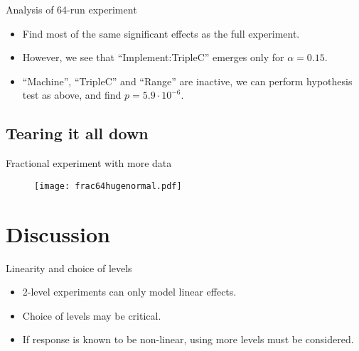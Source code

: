 \documentclass[english,handout,aspectratio=169]{ifislide}
\begin{document}
\begin{frame}{Analysis of 64-run experiment}

  \begin{itemize}
  \item Find most of the same significant effects as the full experiment.
  \item However, we see that ``Implement:TripleC'' emerges only for
  $\alpha=0.15$.
  \item ``Machine'', ``TripleC'' and ``Range'' are inactive, we can
    perform hypothesis test as above, and find $p = 5.9 \cdot 10^{-6}$.
  \end{itemize}
\end{frame}

\subsection{Tearing it all down}

\begin{frame}{Fractional experiment with more data}
\begin{figure}[ht!]
  \centerline{%
  \texttt{[image: frac64hugenormal.pdf]}}
\end{figure}
  
\end{frame}

\section{Discussion}

\begin{frame}{Linearity and choice of levels}
  \begin{itemize}
  \item 2-level experiments can only model linear effects.
  \item Choice of levels may be critical.
  \item If response is known to be non-linear, using more levels must be considered.
  \end{itemize}
  
\end{frame}
\end{document}
